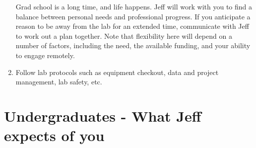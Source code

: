 \documentclass[12pt]{article}
\begin{document}
\begin{enumerate}
Grad school is a long time, and life happens. Jeff will work with you to find a balance between personal needs and professional progress. If you anticipate a reason to be away from the lab for an extended time, communicate with Jeff to work out a plan together. Note that flexibility here will depend on a number of factors, including the need, the available funding, and your ability to engage remotely.
  
\item Follow lab protocols such as equipment checkout, data and project management, lab safety, etc.

\end{enumerate}


\section{Undergraduates - What Jeff expects of you}
\end{document}

